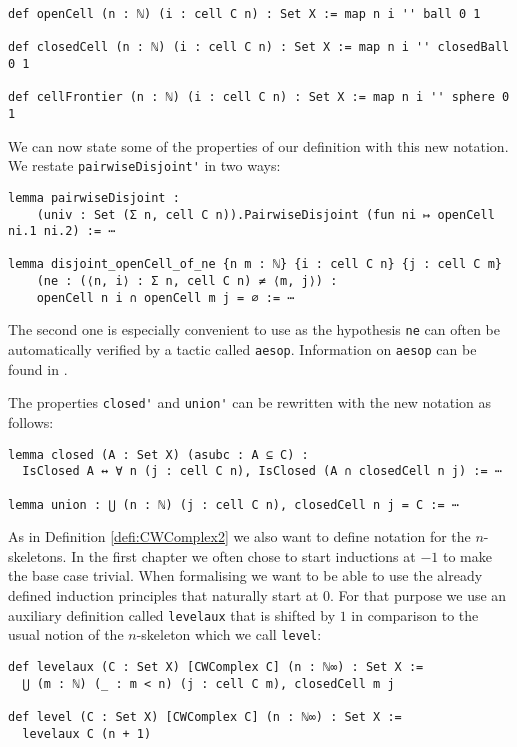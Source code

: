 \begin{lstlisting}
def openCell (n : ℕ) (i : cell C n) : Set X := map n i '' ball 0 1

def closedCell (n : ℕ) (i : cell C n) : Set X := map n i '' closedBall 0 1

def cellFrontier (n : ℕ) (i : cell C n) : Set X := map n i '' sphere 0 1
\end{lstlisting}

We can now state some of the properties of our definition with this new notation. 
We restate \lstinline{pairwiseDisjoint'} in two ways:

\begin{lstlisting}
lemma pairwiseDisjoint :
    (univ : Set (Σ n, cell C n)).PairwiseDisjoint (fun ni ↦ openCell ni.1 ni.2) := ⋯

lemma disjoint_openCell_of_ne {n m : ℕ} {i : cell C n} {j : cell C m}
    (ne : (⟨n, i⟩ : Σ n, cell C n) ≠ ⟨m, j⟩) : 
    openCell n i ∩ openCell m j = ∅ := ⋯
\end{lstlisting}

The second one is especially convenient to use as the hypothesis \lstinline{ne} can often be automatically verified by a tactic called \lstinline{aesop}. 
Information on \lstinline{aesop} can be found in \cite{Limperg2023}. 

The properties \lstinline{closed'} and \lstinline{union'} can be rewritten with the new notation as follows: 

\begin{lstlisting}
lemma closed (A : Set X) (asubc : A ⊆ C) :
  IsClosed A ↔ ∀ n (j : cell C n), IsClosed (A ∩ closedCell n j) := ⋯

lemma union : ⋃ (n : ℕ) (j : cell C n), closedCell n j = C := ⋯
\end{lstlisting}

As in Definition \ref{defi:CWComplex2} we also want to define notation for the $n$-skeletons. 
In the first chapter we often chose to start inductions at $-1$ to make the base case trivial. 
When formalising we want to be able to use the already defined induction principles that naturally start at $0$.
For that purpose we use an auxiliary definition called \lstinline{levelaux} that is shifted by $1$ in comparison to the usual notion of the $n$-skeleton which we call \lstinline{level}: 

\begin{lstlisting}
def levelaux (C : Set X) [CWComplex C] (n : ℕ∞) : Set X :=
  ⋃ (m : ℕ) (_ : m < n) (j : cell C m), closedCell m j

def level (C : Set X) [CWComplex C] (n : ℕ∞) : Set X :=
  levelaux C (n + 1)
\end{lstlisting}

